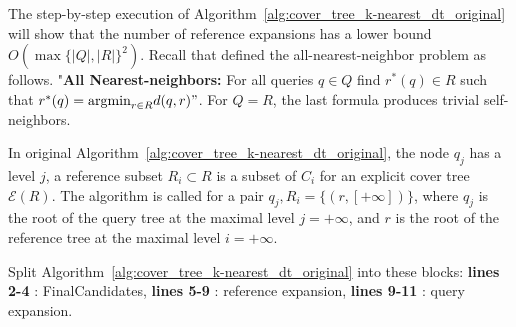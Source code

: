\documentclass{vgtc}                          %
\numberwithin{algocf}{section}
\theoremstyle{definition}
\theoremstyle{definition}
\theoremstyle{definition}
\theoremstyle{plain}
\newcommand{\T}{\mathcal{E}}
\begin{document}
\medskip
\noindent
The step-by-step execution of Algorithm~\ref{alg:cover_tree_k-nearest_dt_original} will show that the number of reference expansions has a lower bound $O(\max\{|Q|,|R|\}^2)$.  Recall that \cite[End of Section~1]{ram2009linear} defined the all-nearest-neighbor problem as follows. 
"\textbf{All Nearest-neighbors:} For all queries $q \in Q$ find $r^{*}(q) \in R$ such that $r^{*}(q) = \mathrm{argmin}_{r \in R}d(q,r)"$. 
For $Q=R$, the last formula produces trivial self-neighbors.

\medskip
\noindent
In original Algorithm~\ref{alg:cover_tree_k-nearest_dt_original}, the node $q_j$ has a level $j$, a reference subset $R_i\subset R$ is a subset of $C_i$ for an explicit cover tree $\T(R)$. 
The algorithm is called for a pair $q_j, R_{i} = \{(r, [+\infty])\}$, where $q_j$ is the root of the query tree at the maximal level $j = +\infty$,
and $r$ is the root of the reference tree at the maximal level $i = +\infty$. 

\medskip
\noindent
Split Algorithm~\ref{alg:cover_tree_k-nearest_dt_original} into these blocks:
\textbf{lines 2-4} : FinalCandidates,
\textbf{lines 5-9} : reference expansion,
\textbf{lines 9-11} : query expansion. 
\end{document}
